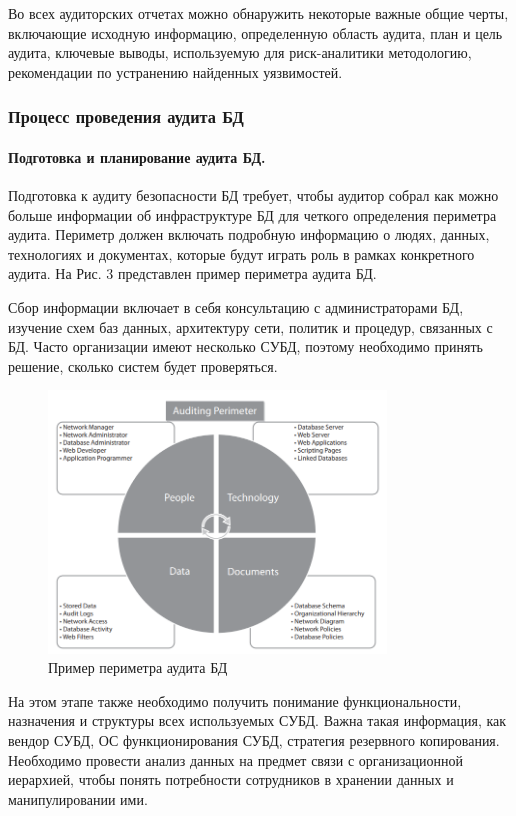 Во всех аудиторских отчетах можно обнаружить некоторые важные общие черты, включающие исходную информацию, определенную область аудита, план и цель аудита, ключевые выводы, используемую для риск-аналитики методологию, рекомендации по устранению найденных уязвимостей.

\subsubsection{Процесс проведения аудита БД}

\paragraph{Подготовка и планирование аудита БД.}

Подготовка к аудиту безопасности БД требует, чтобы аудитор собрал как можно больше информации об инфраструктуре БД для четкого определения периметра аудита. Периметр должен включать подробную информацию о людях, данных, технологиях и документах, которые будут играть роль в рамках конкретного аудита. На Рис. 3 представлен пример периметра аудита БД.

Сбор информации включает в себя консультацию с администраторами БД, изучение схем баз данных, архитектуру сети, политик и процедур, связанных с БД. Часто организации имеют несколько СУБД, поэтому необходимо принять решение, сколько систем будет проверяться.

\begin{figure}[h!]
    \centering
    \includegraphics[width=0.8\textwidth]{assets/DB_audit_perimeter}
    \caption{Пример периметра аудита БД}
\end{figure}

На этом этапе также необходимо получить понимание функциональности, назначения и структуры всех используемых СУБД. Важна такая информация, как вендор СУБД, ОС функционирования СУБД, стратегия резервного копирования. Необходимо провести анализ данных на предмет связи с организационной иерархией, чтобы понять потребности сотрудников в хранении данных и манипулировании ими.

